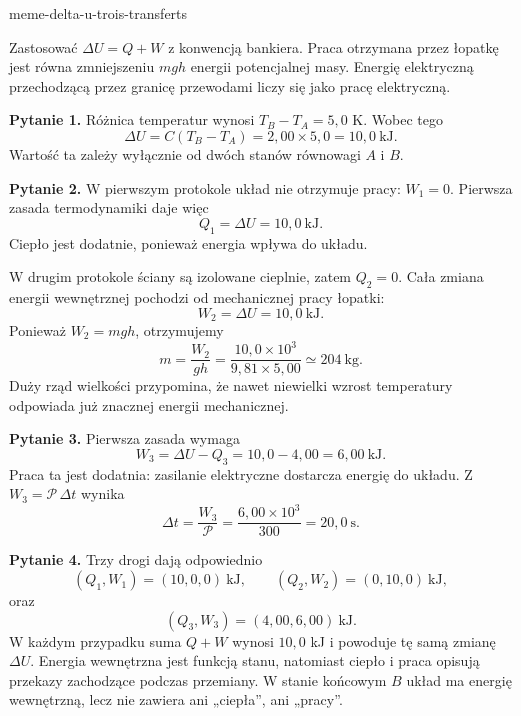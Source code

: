 \begin{exo}{meme-delta-u-trois-transferts}
\begin{indication}
Zastosować $\Delta U=Q+W$ z konwencją bankiera. Praca otrzymana przez łopatkę
jest równa zmniejszeniu $mgh$ energii potencjalnej masy. Energię elektryczną
przechodzącą przez granicę przewodami liczy się jako pracę elektryczną.
\end{indication}

\begin{solution}
\textbf{Pytanie 1.} Różnica temperatur wynosi $T_B-T_A=5{,}0$ K. Wobec tego
\[\Delta U=C(T_B-T_A)=2{,}00\times5{,}0=10{,}0\ \mathrm{kJ}.\]
Wartość ta zależy wyłącznie od dwóch stanów równowagi $A$ i $B$.

\textbf{Pytanie 2.} W pierwszym protokole układ nie otrzymuje pracy: $W_1=0$.
Pierwsza zasada termodynamiki daje więc
\[Q_1=\Delta U=10{,}0\ \mathrm{kJ}.\]
Ciepło jest dodatnie, ponieważ energia wpływa do układu.

W drugim protokole ściany są izolowane cieplnie, zatem $Q_2=0$. Cała zmiana
energii wewnętrznej pochodzi od mechanicznej pracy łopatki:
\[W_2=\Delta U=10{,}0\ \mathrm{kJ}.\]
Ponieważ $W_2=mgh$, otrzymujemy
\[m=\frac{W_2}{gh}=\frac{10{,}0\times10^3}{9{,}81\times5{,}00}\simeq204\ \mathrm{kg}.\]
Duży rząd wielkości przypomina, że nawet niewielki wzrost temperatury
odpowiada już znacznej energii mechanicznej.

\textbf{Pytanie 3.} Pierwsza zasada wymaga
\[W_3=\Delta U-Q_3=10{,}0-4{,}00=6{,}00\ \mathrm{kJ}.\]
Praca ta jest dodatnia: zasilanie elektryczne dostarcza energię do układu.
Z $W_3=\mathcal P\,\Delta t$ wynika
\[\Delta t=\frac{W_3}{\mathcal P}=\frac{6{,}00\times10^3}{300}=20{,}0\ \mathrm{s}.\]

\textbf{Pytanie 4.} Trzy drogi dają odpowiednio
\[(Q_1,W_1)=(10{,}0,0)\ \mathrm{kJ},\qquad(Q_2,W_2)=(0,10{,}0)\ \mathrm{kJ},\]
oraz
\[(Q_3,W_3)=(4{,}00,6{,}00)\ \mathrm{kJ}.\]
W każdym przypadku suma $Q+W$ wynosi $10{,}0$ kJ i powoduje tę samą zmianę
$\Delta U$. Energia wewnętrzna jest funkcją stanu, natomiast ciepło i praca
opisują przekazy zachodzące podczas przemiany. W stanie końcowym $B$ układ ma
energię wewnętrzną, lecz nie zawiera ani „ciepła”, ani „pracy”.
\end{solution}
\end{exo}


